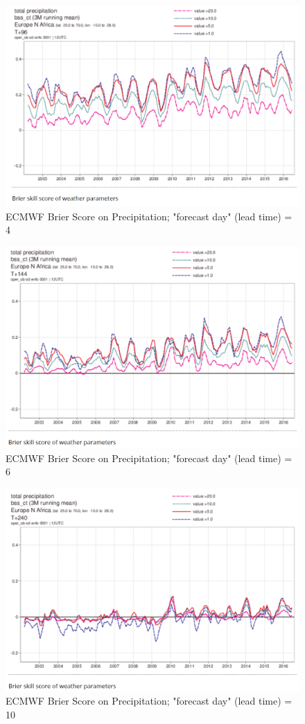 \documentclass[logos,parttoc,morelanguage=french,morelanguage=german]{orsay-memoire}
\begin{document}
\begin{figure}[hp]
\centering
\includegraphics[width=0.6\linewidth]{images/exempleECMWF4day.png}
  \caption{ECMWF Brier Score on Precipitation; "forecast day" (lead time) = 4}
  \label{fig:ecmwfBrier4day}
\end{figure}

\begin{figure}[hp]
\centering
\includegraphics[width=0.6\linewidth]{images/exempleECMWF6day.png}
  \caption{ECMWF Brier Score on Precipitation; "forecast day" (lead time) = 6}
  \label{fig:ecmwfBrier6day}
\end{figure}

\begin{figure}[hp]
\centering
\includegraphics[width=0.6\linewidth]{images/exempleECMWF10day.png}
  \caption{ECMWF Brier Score on Precipitation; "forecast day" (lead time) = 10}
  \label{fig:ecmwfBrier10day}
\end{figure}
\end{document}

